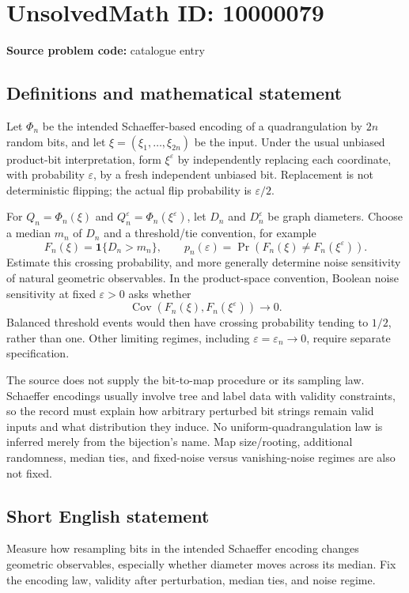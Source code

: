 \documentclass[11pt]{article}
\begin{document}
\section*{UnsolvedMath ID: 10000079}
\textbf{Source problem code:} catalogue entry
\subsection{Definitions and mathematical statement}
Let $\Phi_n$ be the intended Schaeffer-based encoding of a quadrangulation by $2n$ random bits, and let $\xi=(\xi_1,\ldots,\xi_{2n})$ be the input. Under the usual unbiased product-bit interpretation, form $\xi^\varepsilon$ by independently replacing each coordinate, with probability $\varepsilon$, by a fresh independent unbiased bit. Replacement is not deterministic flipping; the actual flip probability is $\varepsilon/2$.

For $Q_n=\Phi_n(\xi)$ and $Q_n^\varepsilon=\Phi_n(\xi^\varepsilon)$, let $D_n$ and $D_n^\varepsilon$ be graph diameters. Choose a median $m_n$ of $D_n$ and a threshold/tie convention, for example
\[
F_n(\xi)=\mathbf1\{D_n>m_n\},\qquad
p_n(\varepsilon)=\Pr(F_n(\xi)\ne F_n(\xi^\varepsilon)).
\]
Estimate this crossing probability, and more generally determine noise sensitivity of natural geometric observables. In the product-space convention, Boolean noise sensitivity at fixed $\varepsilon>0$ asks whether
\[
\operatorname{Cov}(F_n(\xi),F_n(\xi^\varepsilon))\longrightarrow0.
\]
Balanced threshold events would then have crossing probability tending to $1/2$, rather than one. Other limiting regimes, including $\varepsilon=\varepsilon_n\to0$, require separate specification.

The source does not supply the bit-to-map procedure or its sampling law. Schaeffer encodings usually involve tree and label data with validity constraints, so the record must explain how arbitrary perturbed bit strings remain valid inputs and what distribution they induce. No uniform-quadrangulation law is inferred merely from the bijection's name. Map size/rooting, additional randomness, median ties, and fixed-noise versus vanishing-noise regimes are also not fixed.
\subsection{Short English statement}
Measure how resampling bits in the intended Schaeffer encoding changes geometric observables, especially whether diameter moves across its median. Fix the encoding law, validity after perturbation, median ties, and noise regime.
\end{document}
